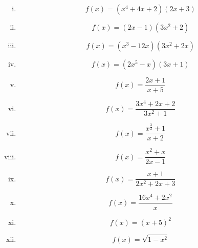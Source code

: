 \documentclass[]{article}
\begin{document}
\begin{multicols}{2}
	\begin{enumerate}[(i)]
		\item		 \[ f(x) = (x^4+4x+2)(2x+3) \,\] %
		\item		 \[ f(x) = (2x-1)(3x^2+2) \,\] %
		\item		 \[ f(x) = (x^3-12x)(3x^2+2x) \,\] %
		\item		 \[ f(x) = (2x^5-x)(3x+1) \,\] %
		\item		\[ f(x) = \frac{2x+1}{x+5} \,\] %
		\item		 \[ f(x) = \frac{3x^4+2x +2}{3x^2+1} \,\] %
		\item		 \[ f(x) = \frac{x^\frac{3}{2}+1}{x+2} \,\] %
		\item		\[ f(x) = \frac{x^2+x}{2x-1} \,\] %
		\item		 \[ f(x) = \frac{x+1}{2x^2+2x+3} \,\] %
		\item		 \[ f(x) = \frac{16x^4+2x^2}{x} \,\] %
		\item		\[ f(x) = (x+5)^2 \,\] %
		\item 		 \[ f(x) = \sqrt{1-x^2} \,\] %

\end{enumerate}
\end{multicols}
\end{document}

